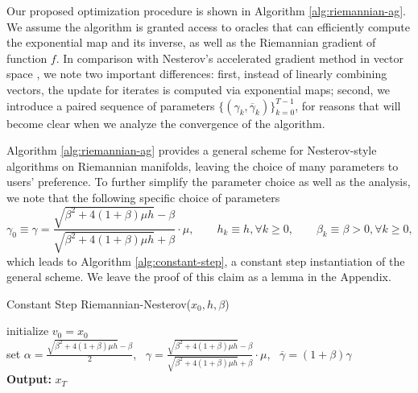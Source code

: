 Our proposed optimization procedure is shown in Algorithm \ref{alg:riemannian-ag}. We assume the algorithm is granted access to oracles that can efficiently compute the exponential map and its inverse, as well as the Riemannian gradient of function $f$. In comparison with Nesterov's accelerated gradient method in vector space \citep[p.76]{nesterov2004introductory}, we note two important differences: first, instead of linearly combining vectors, the update for iterates is computed via exponential maps; second, we introduce a paired sequence of parameters $\{(\gamma_k, \overline{\gamma}_k)\}_{k=0}^{T-1}$, for reasons that will become clear when we analyze the convergence of the algorithm. 

Algorithm \ref{alg:riemannian-ag} provides a general scheme for Nesterov-style algorithms on Riemannian manifolds, leaving the choice of many parameters to users' preference. To further simplify the parameter choice as well as the analysis, we note that the following specific choice of parameters
\[ \gamma_0\equiv\gamma = \frac{\sqrt{\beta^2+4(1+\beta)\mu h}-\beta}{\sqrt{\beta^2+4(1+\beta)\mu h}+\beta}\cdot \mu, \qquad h_k\equiv h, \forall k\ge 0, \qquad \beta_k\equiv \beta > 0, \forall k\ge 0, \]
which leads to Algorithm \ref{alg:constant-step}, a constant step instantiation of the general scheme. We leave the proof of this claim as a lemma in the Appendix.

\begin{algorithm}[hbtp]
	\caption{Constant Step Riemannian-Nesterov($x_0, h, \beta$)}  \label{alg:constant-step}
	\SetAlgoLined
	initialize $v_0 = x_0$\\
	set $\alpha = \frac{\sqrt{\beta^2+4(1+\beta)\mu h}-\beta}{2}$,~ $\gamma = \frac{\sqrt{\beta^2+4(1+\beta)\mu h}-\beta}{\sqrt{\beta^2+4(1+\beta)\mu h}+\beta}\cdot \mu$,~ $\overline{\gamma} = (1+\beta)\gamma$\\
	{\bf Output:} $x_T$
\end{algorithm}

